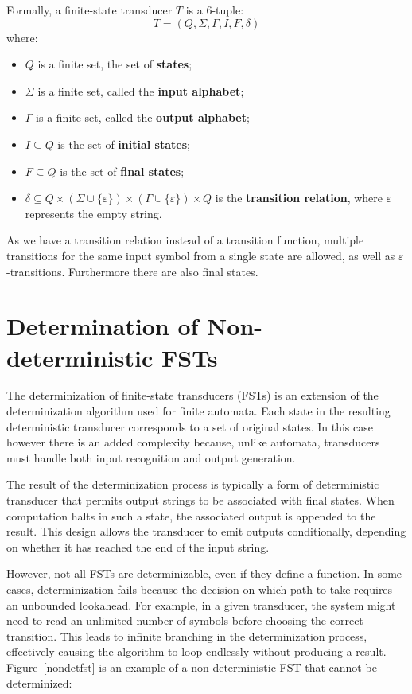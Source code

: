 Formally, a finite-state transducer $T$ is a 6-tuple: \cite{finite_state_transducer}
\[
T = (Q, \Sigma, \Gamma, I, F, \delta)
\]
where:
\begin{itemize}
    \item $Q$ is a finite set, the set of \textbf{states};
    \item $\Sigma$ is a finite set, called the \textbf{input alphabet};
    \item $\Gamma$ is a finite set, called the \textbf{output alphabet};
    \item $I \subseteq Q$ is the set of \textbf{initial states};
    \item $F \subseteq Q$ is the set of \textbf{final states};
    \item $\delta \subseteq Q \times (\Sigma \cup \{\varepsilon\}) \times (\Gamma \cup \{\varepsilon\}) \times Q$ 
    is the \textbf{transition relation}, where $\varepsilon$ represents the empty string.
\end{itemize}

As we have a transition relation instead of a transition function, multiple transitions for the same input symbol from a single state are allowed,
as well as \(\varepsilon\)-transitions. Furthermore there are also final states.

\section*{Determination of Non-deterministic FSTs}

The determinization of finite-state transducers (FSTs) is an extension of the determinization algorithm used for finite automata. 
Each state in the resulting deterministic transducer corresponds to a set of original states. In this case however there is an added complexity because, unlike automata, 
transducers must handle both input recognition and output generation. 

The result of the determinization process is typically a form of deterministic transducer that permits output strings to be associated with final states. 
When computation halts in such a state, the associated output is appended to the result. 
This design allows the transducer to emit outputs conditionally, depending on whether it has reached the end of the input string.

However, not all FSTs are determinizable, even if they define a function. 
In some cases, determinization fails because the decision on which path to take requires an unbounded lookahead. 
For example, in a given transducer, the system might need to read an unlimited number of symbols before choosing the correct transition. 
This leads to infinite branching in the determinization process, effectively causing the algorithm to loop endlessly without producing a result. 
Figure~\ref{nondetfst} is an example of a non-deterministic FST that cannot be determinized: \cite{vannoord1997fst}

